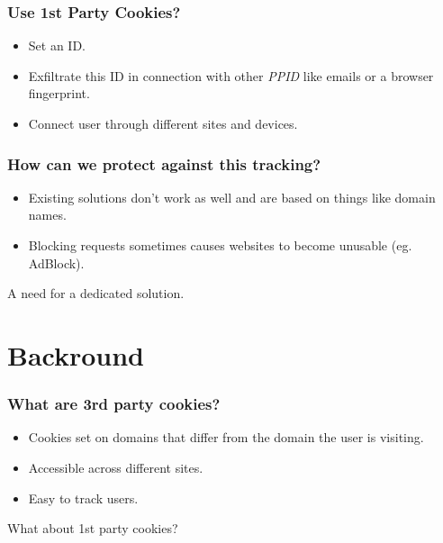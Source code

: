 \documentclass{beamer}
\begin{document}
\begin{frame}
\frametitle{Use 1st Party Cookies?}

\begin{itemize}
\item Set an ID.
\item Exfiltrate this ID in connection with other \textit{PPID} like emails or a browser fingerprint.
\item Connect user through different sites and devices.
\end{itemize}

\end{frame}

\begin{frame}
\frametitle{How can we protect against this tracking?}

\begin{itemize}
\item Existing solutions don't work as well and are based on things like domain names.
\item Blocking requests sometimes causes websites to become unusable (eg. AdBlock).
\end{itemize}

\end{frame}

\begin{frame}
\centering
A need for a dedicated solution.
\end{frame}


\section{Backround}

\begin{frame}
\frametitle{What are 3rd party cookies?}

\begin{itemize}

\item Cookies set on domains that differ from the domain the user is visiting.
\item Accessible across different sites.
\item Easy to track users.

\end{itemize}

\end{frame}

\begin{frame}
\centering
What about 1st party cookies?
\end{frame}
\end{document}
